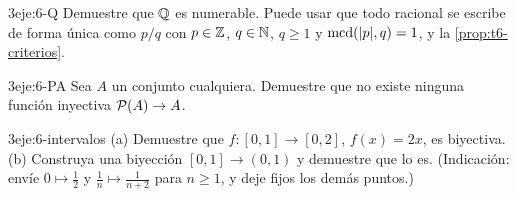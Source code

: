 \begin{ejercicio}{3}{eje:6-Q}
Demuestre que $\mathbb{Q}$ es numerable. Puede usar que todo racional se escribe de forma única como $p/q$ con $p\in\mathbb{Z}$, $q\in\mathbb{N}$, $q\ge1$ y $\operatorname{mcd}(\lvert p\rvert,q)=1$, y la \cref{prop:t6-criterios}.
\end{ejercicio}

\begin{ejercicio}{3}{eje:6-PA}
Sea $A$ un conjunto cualquiera. Demuestre que no existe ninguna función inyectiva $\mathcal{P}(A)\to A$.
\end{ejercicio}

\begin{ejercicio}{3}{eje:6-intervalos}
(a) Demuestre que $f\colon[0,1]\to[0,2]$, $f(x)=2x$, es biyectiva. (b) Construya una biyección $[0,1]\to(0,1)$ y demuestre que lo es. (Indicación: envíe $0\mapsto\tfrac12$ y $\tfrac1n\mapsto\tfrac1{n+2}$ para $n\ge1$, y deje fijos los demás puntos.)
\end{ejercicio}
